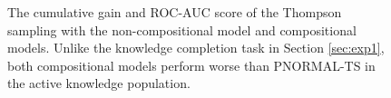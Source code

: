 \begin{figure}[t]
	\centering
	
	\caption{\label{fig:vs_comp} The cumulative gain and ROC-AUC score of the Thompson sampling with the non-compositional model and compositional models. Unlike the knowledge completion task in Section \ref{sec:exp1}, both compositional models perform worse than PNORMAL-TS in the active knowledge population.}
\end{figure}


